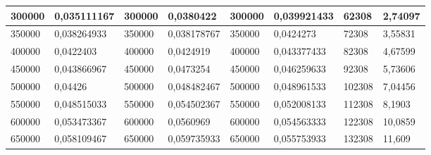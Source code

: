 \documentclass[11pt,openany]{book}
\begin{document}
\begin{table}[!ht]
\begin{tabular}{|l|l|l|l|l|l|l|l|}
        300000                                            & 0,035111167                                        & 300000                                              & 0,0380422                                           & 300000          & 0,039921433     & 62308           & 2,74097         \\ \hline
        350000                                            & 0,038264933                                        & 350000                                              & 0,038178767                                         & 350000          & 0,0424273       & 72308           & 3,55831         \\ \hline
        400000                                            & 0,0422403                                          & 400000                                              & 0,0424919                                           & 400000          & 0,043377433     & 82308           & 4,67599         \\ \hline
        450000                                            & 0,043866967                                        & 450000                                              & 0,0473254                                           & 450000          & 0,046259633     & 92308           & 5,73606         \\ \hline
        500000                                            & 0,04426                                            & 500000                                              & 0,048482467                                         & 500000          & 0,048961533     & 102308          & 7,04456         \\ \hline
        550000                                            & 0,048515033                                        & 550000                                              & 0,054502367                                         & 550000          & 0,052008133     & 112308          & 8,1903          \\ \hline
        600000                                            & 0,053473367                                        & 600000                                              & 0,0560969                                           & 600000          & 0,054563333     & 122308          & 10,0859         \\ \hline
        650000                                            & 0,058109467                                        & 650000                                              & 0,059735933                                         & 650000          & 0,055753933     & 132308          & 11,609          \\ \hline

\end{tabular}
\end{table}
\end{document}
